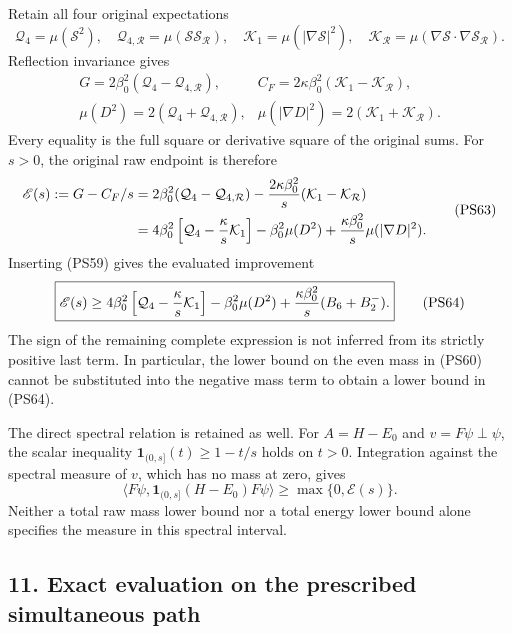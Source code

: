 \documentclass[11pt]{article}
\begin{document}
Retain all four original expectations
\[
 \mathcal Q_4=\mu(\mathcal S^2),\quad
 \mathcal Q_{4,\mathcal R}=\mu(\mathcal S\mathcal S_{\mathcal R}),
 \quad
 \mathcal K_1=\mu(|\nabla\mathcal S|^2),\quad
 \mathcal K_{\mathcal R}
                =\mu(\nabla\mathcal S\cdot\nabla\mathcal S_{\mathcal R}).
 \]
Reflection invariance gives
\[
 \begin{array}{ll}
 G=2\beta_0^2(\mathcal Q_4-\mathcal Q_{4,\mathcal R}),&
 C_F=2\kappa\beta_0^2(\mathcal K_1-\mathcal K_{\mathcal R}),\\
 \mu(D^2)=2(\mathcal Q_4+\mathcal Q_{4,\mathcal R}),&
 \mu(|\nabla D|^2)=2(\mathcal K_1+\mathcal K_{\mathcal R}).
 \end{array}
 \tag{PS62}
\]
Every equality is the full square or derivative square of the
original sums. For \(s>0\), the original raw endpoint is therefore
\[
 \begin{aligned}
 \mathscr E(s):=G-C_F/s
 &=2\beta_0^2(\mathcal Q_4-\mathcal Q_{4,\mathcal R})
   -{2\kappa\beta_0^2\over s}
                       (\mathcal K_1-\mathcal K_{\mathcal R})\\
 &=4\beta_0^2\left[\mathcal Q_4-{\kappa\over s}\mathcal K_1\right]
    -\beta_0^2\mu(D^2)
    +{\kappa\beta_0^2\over s}\mu(|\nabla D|^2).
 \end{aligned}
 \tag{PS63}
\]
Inserting (PS59) gives the evaluated improvement
\[
 \boxed{\mathscr E(s)\ge
 4\beta_0^2\left[\mathcal Q_4-{\kappa\over s}\mathcal K_1\right]
 -\beta_0^2\mu(D^2)
 +{\kappa\beta_0^2\over s}(B_6+B_2^-).}
 \tag{PS64}
\]
The sign of the remaining complete expression is not inferred
from its strictly positive last term. In particular, the lower
bound on the even mass in (PS60) cannot be substituted into the
negative mass term to obtain a lower bound in (PS64).

The direct spectral relation is retained as well. For \(A=H-E_0\)
and \(v=F\psi\perp\psi\), the scalar inequality
\(\mathbf1_{(0,s]}(t)\ge1-t/s\) holds on \(t>0\).
Integration against the spectral measure of \(v\), which has
no mass at zero, gives
\[
 \langle F\psi,\mathbf1_{(0,s]}(H-E_0)F\psi\rangle
                         \ge\max\{0,\mathscr E(s)\}.
 \tag{PS65}
\]
Neither a total raw mass lower bound nor a total energy lower
bound alone specifies the measure in this spectral interval.

\subsection*{11. Exact evaluation on the prescribed simultaneous path}
\end{document}
